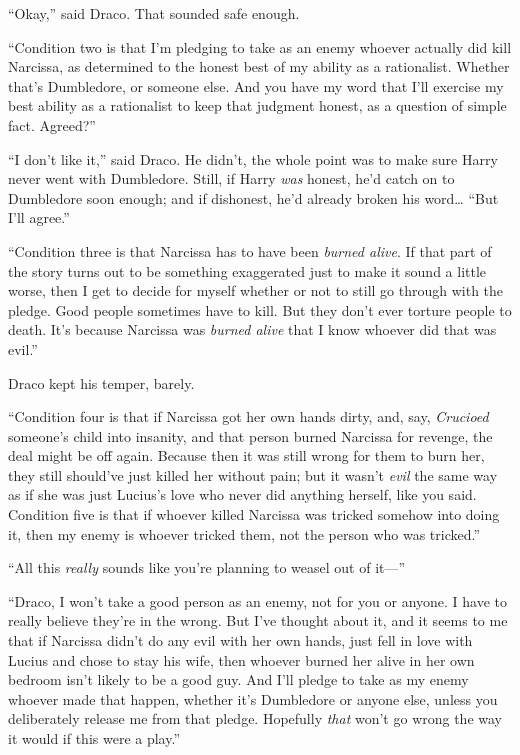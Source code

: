 ``Okay,'' said Draco. That sounded safe enough.

``Condition two is that I'm pledging to take as an enemy whoever
actually did kill Narcissa, as determined to the honest best of my
ability as a rationalist. Whether that's Dumbledore, or someone else.
And you have my word that I'll exercise my best ability as a rationalist
to keep that judgment honest, as a question of simple fact. Agreed?''

``I don't like it,'' said Draco. He didn't, the whole point was to make
sure Harry never went with Dumbledore. Still, if Harry \emph{was}
honest, he'd catch on to Dumbledore soon enough; and if dishonest, he'd
already broken his word\ldots{} ``But I'll agree.''

``Condition three is that Narcissa has to have been \emph{burned alive}.
If that part of the story turns out to be something exaggerated just to
make it sound a little worse, then I get to decide for myself whether or
not to still go through with the pledge. Good people sometimes have to
kill. But they don't ever torture people to death. It's because Narcissa
was \emph{burned alive} that I know whoever did that was evil.''

Draco kept his temper, barely.

``Condition four is that if Narcissa got her own hands dirty, and, say,
\emph{Crucioed} someone's child into insanity, and that person burned
Narcissa for revenge, the deal might be off again. Because then it was
still wrong for them to burn her, they still should've just killed her
without pain; but it wasn't \emph{evil} the same way as if she was just
Lucius's love who never did anything herself, like you said. Condition
five is that if whoever killed Narcissa was tricked somehow into doing
it, then my enemy is whoever tricked them, not the person who was
tricked.''

``All this \emph{really} sounds like you're planning to weasel out of
it---''

``Draco, I won't take a good person as an enemy, not for you or anyone.
I have to really believe they're in the wrong. But I've thought about
it, and it seems to me that if Narcissa didn't do any evil with her own
hands, just fell in love with Lucius and chose to stay his wife, then
whoever burned her alive in her own bedroom isn't likely to be a good
guy. And I'll pledge to take as my enemy whoever made that happen,
whether it's Dumbledore or anyone else, unless you deliberately release
me from that pledge. Hopefully \emph{that} won't go wrong the way it
would if this were a play.''

